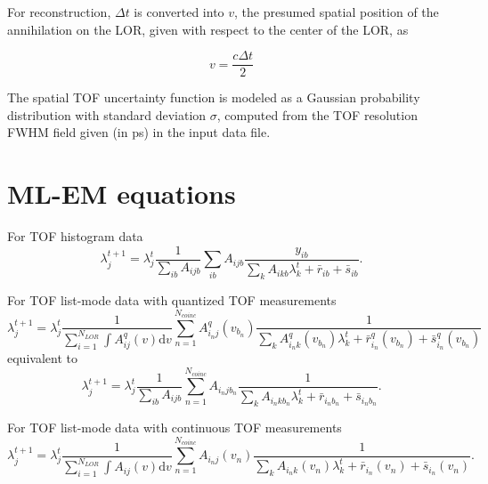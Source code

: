 \documentclass[a4paper, 11pt]{article}
\begin{document}
For reconstruction, $\Delta t$ is converted into $v$, the presumed spatial position of the annihilation on the LOR, given with respect to the center of the LOR, as

\begin{equation}
v = \frac{c\Delta t}{2}
\end{equation}

The spatial TOF uncertainty function is modeled as a Gaussian probability distribution with standard deviation $\sigma$, computed from the TOF resolution FWHM field given (in ps) in the input data file.

\section{ML-EM equations}


For TOF histogram data
\begin{equation}
\lambda_j^{t+1}=\lambda_j^{t}\frac{1}{\sum_{ib} A_{ijb}}\sum_{ib}{A_{ijb}\frac{y_{ib}}{\sum_k{A_{ikb}\lambda_k^t+\bar{r}_{ib}+\bar{s}_{ib}}}}.
\label{mlem_h}
\end{equation}

\noindent For TOF list-mode data with quantized TOF measurements
\begin{equation}
\lambda_j^{t+1}=\lambda_j^{t}\frac{1}{\sum_{i=1}^{N_{LOR}} \int A^q_{ij}(v)\mathrm{d}v} \sum_{n=1}^{N_{coinc}}{A^q_{i_nj}(v_{b_n})\frac{1}{\sum_k{A^q_{i_nk}(v_{b_n})\lambda^t_k+\bar{r}^q_{i_n}(v_{b_n})+\bar{s}^q_{i_n}(v_{b_n})}}}
\label{mlem_q_l}
\end{equation}
equivalent to
\begin{equation}
\lambda_j^{t+1}=\lambda_j^{t}\frac{1}{\sum_{ib} A_{ijb}}\sum_{n=1}^{N_{coinc}}{A_{i_njb_n}\frac{1}{\sum_k{A_{i_nkb_n}\lambda_k^t+\bar{r}_{i_nb_n}+\bar{s}_{i_nb_n}}}}.
\label{mlem_q_h}
\end{equation}

\noindent For TOF list-mode data with continuous TOF measurements
\begin{equation}
\lambda_j^{t+1}=\lambda_j^{t}\frac{1}{\sum_{i=1}^{N_{LOR}} \int A_{ij}(v)\mathrm{d}v} \sum_{n=1}^{N_{coinc}}{A_{i_nj}(v_n)\frac{1}{\sum_k{A_{i_nk}(v_n)\lambda_k^t+\bar{r}_{i_n}(v_n)+\bar{s}_{i_n}(v_n)}}}.
\label{mlem_l}
\end{equation}
\end{document}
